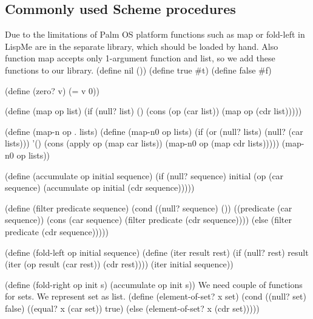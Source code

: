 \documentclass[a4paper,10pt]{article}%
\theoremstyle{definition} \newtheorem{Def}{Definition}
\begin{document}
\subsection{Commonly used Scheme procedures}
\label{sec:commonly-used-scheme}

\nwenddocs{}\nwdocspar
Due to the limitations of Palm OS platform functions such as {\Tt{}map\nwendquote} or {\Tt{}fold-left\nwendquote} in LispMe are in the separate library, which should be loaded by hand. Also function {\Tt{}map\nwendquote} accepts only 1-argument function and list, so we add these functions to our library. 
\nwenddocs{}\endmoddef\nwstartdeflinemarkup{}\nwenddeflinemarkup
(define nil ())
(define true #t)
(define false #f)

(define (zero? v)
        (= v 0))

(define (map op list)
        (if (null? list) ()
                (cons (op (car list)) (map op (cdr list)))))

(define (map-n op . lists) 
    (define (map-n0 op  lists)
        (if (or (null? lists) (null? (car lists))) '()
        (cons (apply op (map car lists))
                (map-n0 op  (map cdr lists)))))
    (map-n0 op lists))

(define (accumulate op initial sequence)
  (if (null? sequence)
      initial
      (op (car sequence)
          (accumulate op initial (cdr sequence)))))

(define (filter predicate sequence)
  (cond ((null? sequence) ())
        ((predicate (car sequence))
         (cons (car sequence)
               (filter predicate (cdr sequence))))
        (else (filter predicate (cdr sequence)))))

(define (fold-left op initial sequence)
  (define (iter result rest)
    (if (null? rest)
        result
        (iter (op result (car rest))
              (cdr rest))))
  (iter initial sequence))

(define (fold-right op init s) (accumulate op init s))
\nwendcode{}\nwdocspar
We need couple of functions for sets. We represent set as list.
\nwenddocs{}\endmoddef\nwstartdeflinemarkup{}\nwenddeflinemarkup
(define (element-of-set? x set)
  (cond ((null? set) false)
        ((equal? x (car set)) true)
        (else (element-of-set? x (cdr set)))))
\end{document}
